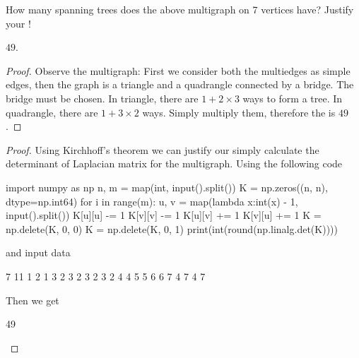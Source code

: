 \documentclass[11pt,a4paper,oneside]{article}
\begin{document}
\begin{problem}{4}
\statement
How many spanning trees does the above multigraph on 7 vertices have?
Justify your !

\solution

$49$.
\begin{proof}
Observe the multigraph: First we consider both the multiedges as simple edges, then the graph is a triangle and a quadrangle connected by a bridge. The bridge must be chosen. In triangle, there are $1 + 2 \times 3$ ways to form a tree. In quadrangle, there are $1 + 3 \times 2$ ways. Simply multiply them, therefore the  is $49$.
\end{proof}
\begin{proof}
Using Kirchhoff's theorem we can justify our  simply calculate the determinant of Laplacian matrix for the multigraph. Using the following code
\begin{python}
import numpy as np
n, m = map(int, input().split())
K = np.zeros((n, n), dtype=np.int64)
for i in range(m):
	u, v = map(lambda x:int(x) - 1, input().split())
	K[u][u] -= 1
	K[v][v] -= 1
	K[u][v] += 1
	K[v][u] += 1
K = np.delete(K, 0, 0)
K = np.delete(K, 0, 1)
print(int(round(np.linalg.det(K))))
\end{python}
and input data
\begin{python}
7 11
1 2
1 3
2 3
2 3
2 3
2 4
4 5
5 6
6 7
4 7
4 7
\end{python}
Then we get 
\begin{python}
49
\end{python}
\end{proof}
\end{problem}
\end{document}
